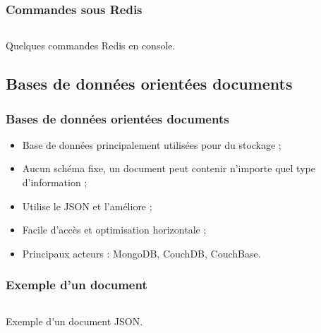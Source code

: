 	\begin{frame}
		\frametitle{Commandes sous Redis}

		\begin{listing}[H]
			\inputminted[fontsize=\tiny, linenos=true]{text}{code/commandesRedis.txt}
			\caption{Quelques commandes Redis en console.}
		\end{listing}

	\end{frame}

	\subsection{Bases de données orientées documents}
	\begin{frame}
		\frametitle{Bases de données orientées documents}

		\begin{itemize}
			\item Base de données principalement utilisées pour du stockage ;
			\item Aucun schéma fixe, un document peut contenir n'importe quel type d'information ;
			\item Utilise le JSON et l'améliore ;
			\item Facile d'accès et optimisation horizontale ;
			\item Principaux acteurs : MongoDB, CouchDB, CouchBase.
		\end{itemize}

	\end{frame}

	\begin{frame}
		\frametitle{Exemple d'un document}

		\begin{listing}[H]
			\inputminted[fontsize=\tiny, linenos=true]{json}{code/exemple-document.json}
			\caption{Exemple d'un document JSON.}
		\end{listing}


	\end{frame}


